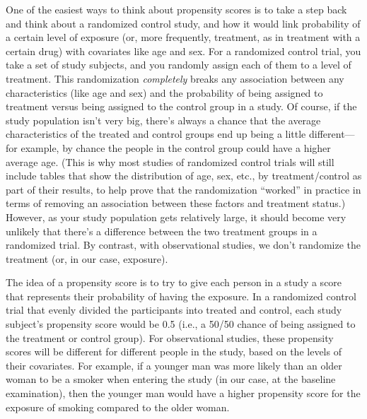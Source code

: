 \documentclass[
]{book}
\begin{document}
One of the easiest ways to think about propensity scores is to take a step back and think about a randomized control study, and how it would link probability of a certain level of exposure (or, more frequently, treatment, as in treatment with a certain drug) with covariates like age and sex. For a randomized control trial, you take a set of study subjects, and you randomly assign each of them to a level of treatment. This randomization \emph{completely} breaks any association between any characteristics (like age and sex) and the probability of being assigned to treatment versus being assigned to the control group in a study. Of course, if the study population isn't very big, there's always a chance that the average characteristics of the treated and control groups end up being a little different---for example, by chance the people in the control group could have a higher average age. (This is why most studies of randomized control trials will still include tables that show the distribution of age, sex, etc., by treatment/control as part of their results, to help prove that the randomization ``worked'' in practice in terms of removing an association between these factors and treatment status.) However, as your study population gets relatively large, it should become very unlikely that there's a difference between the two treatment groups in a randomized trial. By contrast, with observational studies, we don't randomize the treatment (or, in our case, exposure).

The idea of a propensity score is to try to give each person in a study a score that represents their probability of having the exposure. In a randomized control trial that evenly divided the participants into treated and control, each study subject's propensity score would be 0.5 (i.e., a 50/50 chance of being assigned to the treatment or control group). For observational studies, these propensity scores will be different for different people in the study, based on the levels of their covariates. For example, if a younger man was more likely than an older woman to be a smoker when entering the study (in our case, at the baseline examination), then the younger man would have a higher propensity score for the exposure of smoking compared to the older woman.
\end{document}
